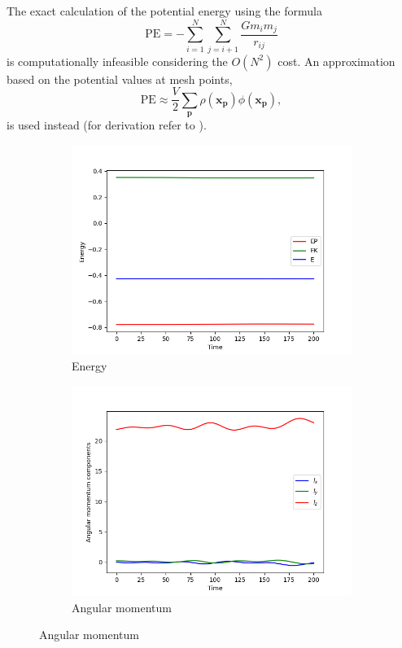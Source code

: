 The exact calculation of the potential energy \cite{taylor2005classical} using the formula
\begin{equation*}
    \textrm{PE} = -\sum_{i=1}^{N}\sum_{j=i+1}^{N}\frac{G m_i m_j}{r_{ij}}
\end{equation*}
is computationally infeasible considering the $O(N^2)$ cost.
An approximation based on the potential values at mesh points,
\begin{equation*}
    \textrm{PE} \approx \frac{V}{2}\sum_{\mathbf{p}} \rho(\mathbf{x}_\mathbf{p})\phi(\mathbf{x}_\mathbf{p}),
\end{equation*}
is used instead (for derivation refer to \cite{Hockney1988}).
\begin{figure}[!ht]
    \centering
    \begin{subfigure}[b]{0.45\textwidth}
        \centering
        \includegraphics[width=\textwidth]{chapters/results/img/pm-galaxy/energy.png}
        \caption{Energy}
        \label{fig:physical-quantities-pm-sub1}
    \end{subfigure}
    \hfill
    \begin{subfigure}[b]{0.45\textwidth}
        \centering
        \includegraphics[width=\textwidth]{chapters/results/img/pm-galaxy/angular-momentum.png}
        \caption{Angular momentum}
        \label{fig:physical-quantities-pm-sub2}
    \end{subfigure}


\end{figure}
